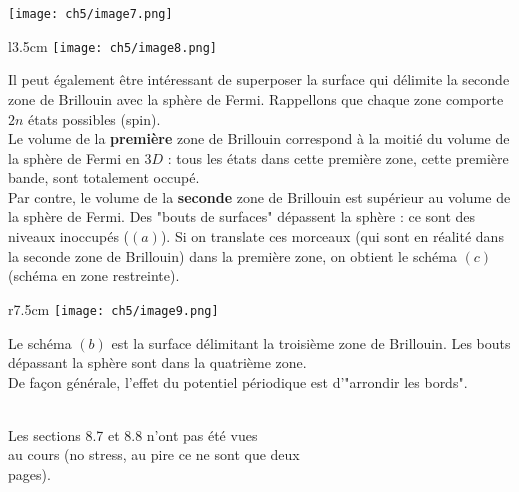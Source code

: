 	\begin{center}
	\texttt{[image: ch5/image7.png]}
	\end{center}

	\begin{wrapfigure}[9]{l}{3.5cm}
	\vspace{-0.5cm}
	\texttt{[image: ch5/image8.png]}
	\end{wrapfigure}		
	Il peut également être intéressant de superposer la surface qui délimite 
	la seconde zone de Brillouin avec la sphère de Fermi. Rappellons que chaque 
	zone comporte $2n$ états possibles (spin).\\
	Le volume de la \textbf{première} zone de Brillouin correspond à la moitié du 
	volume de la sphère de Fermi en $3D$ : tous les états dans cette première zone, 
	cette première bande, sont totalement occupé. \\
	Par contre, le volume de la \textbf{seconde} zone de Brillouin est supérieur 
	au volume de la sphère de Fermi. Des "bouts de surfaces" dépassent la sphère : 
	ce sont des niveaux inoccupés ($(a)$). Si on translate ces morceaux (qui sont 
	en réalité dans la seconde zone de Brillouin) dans la première zone, on obtient 
	le schéma $(c)$ (schéma en zone restreinte).\\

	\begin{wrapfigure}[15]{r}{7.5cm}
	\vspace{-1.3cm}
	\texttt{[image: ch5/image9.png]}
	\end{wrapfigure}		
	Le schéma $(b)$ est la surface délimitant la troisième zone de Brillouin. Les 
	bouts dépassant la sphère sont dans la quatrième zone. \\
	
	De façon générale, l'effet du potentiel périodique est d'"arrondir les bords".

\ \\


	\danger Les sections 8.7 et 8.8 n'ont pas été vues\\
	 au cours (no stress, au pire 
	ce ne sont que deux\\ pages).








































	